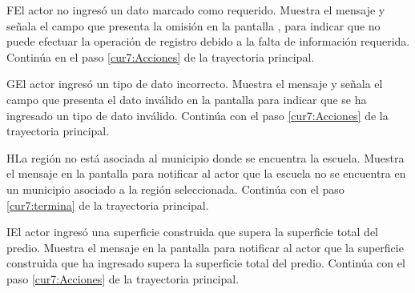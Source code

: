  \begin{UCtrayectoriaA}{F}{El actor no ingresó un dato marcado como requerido.}
    \UCpaso[\UCsist] Muestra el mensaje  y
    señala el campo que presenta la omisión en la pantalla , para indicar que
    no puede efectuar la operación de registro debido a la falta de información requerida.
   \UCpaso[] Continúa en el paso \ref{cur7:Acciones} de la trayectoria principal.
 \end{UCtrayectoriaA}
 
   \begin{UCtrayectoriaA}{G}{El actor ingresó un tipo de dato incorrecto.}
    \UCpaso[\UCsist] Muestra el mensaje  y señala el campo que presenta el dato inválido en la 
    pantalla  para indicar que se ha ingresado un tipo de dato inválido.
    \UCpaso[] Continúa con el paso \ref{cur7:Acciones} de la trayectoria principal.
 \end{UCtrayectoriaA}

   \begin{UCtrayectoriaA}{H}{La región no está asociada al municipio donde se encuentra la escuela.}
    \UCpaso[\UCsist] Muestra el mensaje  en la pantalla  para notificar al actor que la escuela no se encuentra en un municipio asociado a la región seleccionada.
    \UCpaso[] Continúa con el paso \ref{cur7:termina} de la trayectoria principal.
 \end{UCtrayectoriaA}
 
 \begin{UCtrayectoriaA}{I}{El actor ingresó una superficie construida que supera la superficie total del predio.}
  \UCpaso[\UCsist] Muestra el mensaje  en la pantalla  para notificar al actor que la superficie construida que ha ingresado supera la superficie total del predio.
    \UCpaso[] Continúa con el paso \ref{cur7:Acciones} de la trayectoria principal.
 \end{UCtrayectoriaA}
 
